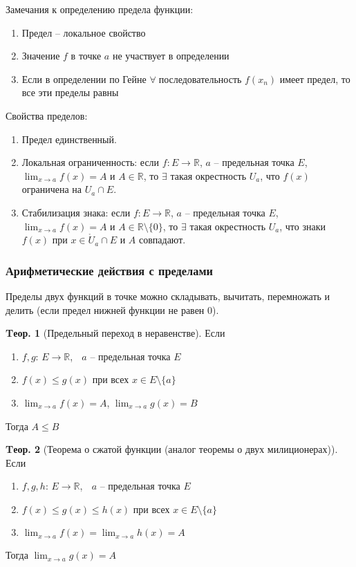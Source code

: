 \documentclass[a4paper,12pt]{article}
\numberwithin{figure}{section}
\theoremstyle{definition}
\theoremstyle{definition}
\newtheorem{theorem}{Tеор.}[section]
\def\ringU{\mathring{U}}
\def\mathR{\mathbb{R}}
\def\leqs{\leqslant}
\def\any {$\forall\;$}
\begin{document}
\bigbreak
Замечания к определению предела функции: \begin{enumerate}
	\item Предел -- локальное свойство
	\item Значение $f$ в точке $a$ не участвует в определении
	\item Если в определении по Гейне \any последовательность $f(x_n)$ имеет предел,
  		  то все эти пределы равны
\end{enumerate}

\bigbreak
Свойства пределов: \begin{enumerate}
	\item Предел единственный.
	\item Локальная ограниченность: если $f\!: E\to \mathR$, $a$ -- предельная точка $E$,
  		  $\displaystyle \lim_{x\to a}f(x)=A$ и $A \in \mathR$,
  		  то $\exists$ такая окрестность $U_a$, что $f(x)$ ограничена на $U_a \cap E$.
	\item Стабилизация знака: если $f\!: E\to \mathR$, $a$ -- предельная точка $E$,
		  $\displaystyle \lim_{x\to a}f(x)=A$ и $A \in \mathR \setminus \{0\}$,
  		  то $\exists$ такая окрестность $U_a$,
  		  что знаки $f(x)$ при $x \in \ringU_a \cap E$ и $A$ совпадают.
\end{enumerate}


\subsubsection{Арифметические действия с пределами}

Пределы двух функций в точке можно складывать, вычитать, перемножать и делить (если предел нижней функции не равен 0).


\begin{theorem}[Предельный переход в неравенстве]
  Если \begin{enumerate}
	\item $f,g :\, E\to\mathR$, $\;$ $a$ -- предельная точка $E$
	\item $f(x) \leqs g(x)$ при всех $x \in E \setminus \{a\}$
	\item $\displaystyle\lim_{x\to a}f(x)=A$, $\displaystyle\lim_{x\to a}g(x)=B$
  \end{enumerate}
  Тогда $A \leqs B$
\end{theorem}

\begin{theorem}[Теорема о сжатой функции (аналог теоремы о двух милиционерах)]
  Если \begin{enumerate}
	\item $f,g,h :\, E\to\mathR$, $\;$ $a$ -- предельная точка $E$
	\item $f(x) \leqs g(x) \leqs h(x)$ при всех $x \in E \setminus \{a\}$
	\item $\displaystyle \lim_{x\to a}f(x)=\lim_{x\to a}h(x)=A$
  \end{enumerate}
  Тогда $\displaystyle \lim_{x\to a}g(x)=A$
\end{theorem}
\end{document}

